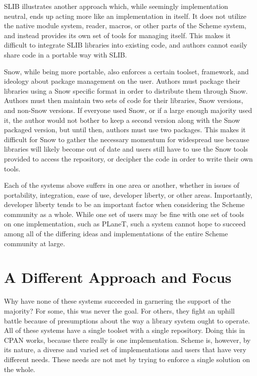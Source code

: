 SLIB illustrates another approach which, 
while seemingly implementation neutral, 
ends up acting more like an implementation in itself.
It does not utilize the native module system, reader, 
macros, or other parts of the Scheme system, and instead 
provides its own set of tools for managing itself. 
This makes it difficult to integrate SLIB libraries into 
existing code, and authors cannot easily share code in a 
portable way with SLIB.

Snow, while being more portable, also enforces a certain toolset, 
framework, and ideology about package management on the user. 
Authors must package their libraries using a Snow specific 
format in order to distribute them through Snow. 
Authors must then maintain two sets of code for their libraries, 
Snow versions, and non-Snow versions.
If everyone used Snow, or if a large enough majority used it, 
the author would not bother to keep a second 
version along with the Snow packaged version, 
but until then, authors must use two packages. 
This makes it difficult for Snow to gather the necessary 
momentum for widespread use because libraries will likely 
become out of date and users still have to use the Snow tools 
provided to access the repository, or decipher the code in 
order to write their own tools.

Each of the systems above suffers in one area or another, 
whether in issues of portability, integration, ease of use, 
developer liberty, or other areas.  
Importantly, developer liberty tends to be an important factor 
when considering the Scheme community as a whole. 
While one set of users may 
be fine with one set of tools on one implementation, such as 
PLaneT, such a system cannot hope to succeed among all of the 
differing ideas and implementations of the entire Scheme 
community at large. 

\section{A Different Approach and Focus}

Why have none of these systems succeeded in garnering the 
support of the majority? 
For some, this was never the goal. 
For others, they fight an uphill battle because of 
presumptions about the way a library system ought to operate. 
All of these systems have a single toolset with a single repository. 
Doing this in CPAN works, because there really is one implementation. 
Scheme is, however, by its nature, a diverse and varied set of 
implementations and users that have very different needs.  These 
needs are not met by trying to enforce a single solution on the 
whole. 

